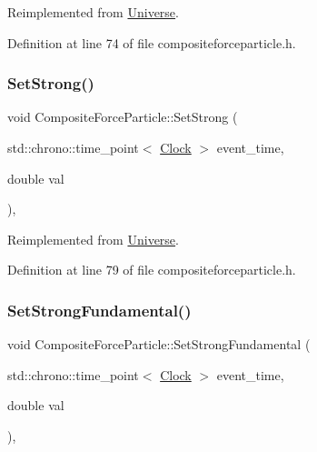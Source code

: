Reimplemented from \hyperlink{class_universe_ae0cb8d86b2fbb8396d605160344b42f5}{Universe}.



Definition at line 74 of file compositeforceparticle.\+h.

\mbox{\label{class_composite_force_particle_a06488ef0457335648b161d3ed746b643}} 
\subsubsection{\texorpdfstring{Set\+Strong()}{SetStrong()}}
{\footnotesize\ttfamily void Composite\+Force\+Particle\+::\+Set\+Strong (\begin{DoxyParamCaption}\item[{std\+::chrono\+::time\+\_\+point$<$ \hyperlink{universe_8h_a0ef8d951d1ca5ab3cfaf7ab4c7a6fd80}{Clock} $>$}]{event\+\_\+time,  }\item[{double}]{val }\end{DoxyParamCaption})\hspace{0.3cm}{\ttfamily [inline]}, {\ttfamily [virtual]}}



Reimplemented from \hyperlink{class_universe_a5946c8f3d4cda305f3ecd10df21a2f94}{Universe}.



Definition at line 79 of file compositeforceparticle.\+h.

\mbox{\label{class_composite_force_particle_a28d835658edcbecf60162475a8cb1ab6}} 
\subsubsection{\texorpdfstring{Set\+Strong\+Fundamental()}{SetStrongFundamental()}}
{\footnotesize\ttfamily void Composite\+Force\+Particle\+::\+Set\+Strong\+Fundamental (\begin{DoxyParamCaption}\item[{std\+::chrono\+::time\+\_\+point$<$ \hyperlink{universe_8h_a0ef8d951d1ca5ab3cfaf7ab4c7a6fd80}{Clock} $>$}]{event\+\_\+time,  }\item[{double}]{val }\end{DoxyParamCaption})\hspace{0.3cm}{\ttfamily [inline]}, {\ttfamily [virtual]}}



